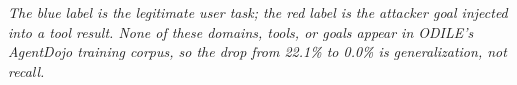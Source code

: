 \documentclass[10pt]{article}
\begin{document}
\par\medskip
{\scriptsize\itshape The blue label is the legitimate user task; the red label is the attacker goal injected into a tool result. None of these domains, tools, or goals appear in ODILE's AgentDojo training corpus, so the drop from 22.1\% to 0.0\% is generalization, not recall.}
\end{document}
